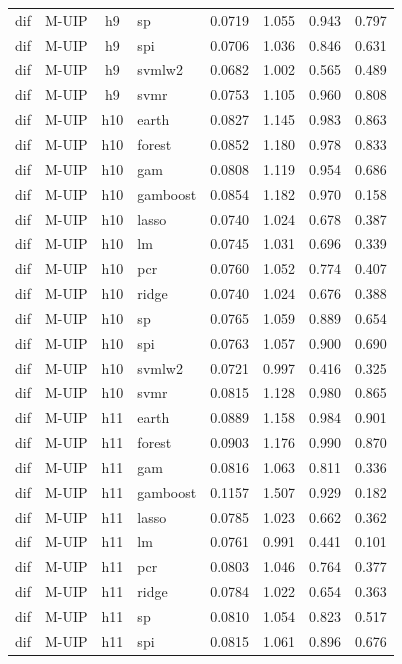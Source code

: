 \begin{ThreePartTable}
\begin{longtable}[t]{llclcccc}
dif & M-UIP & h9 & sp & 0.0719 & 1.055 & 0.943 & 0.797\\
dif & M-UIP & h9 & spi & 0.0706 & 1.036 & 0.846 & 0.631\\
dif & M-UIP & h9 & svmlw2 & 0.0682 & 1.002 & 0.565 & 0.489\\
dif & M-UIP & h9 & svmr & 0.0753 & 1.105 & 0.960 & 0.808\\
\addlinespace
dif & M-UIP & h10 & earth & 0.0827 & 1.145 & 0.983 & 0.863\\
dif & M-UIP & h10 & forest & 0.0852 & 1.180 & 0.978 & 0.833\\
dif & M-UIP & h10 & gam & 0.0808 & 1.119 & 0.954 & 0.686\\
dif & M-UIP & h10 & gamboost & 0.0854 & 1.182 & 0.970 & 0.158\\
dif & M-UIP & h10 & lasso & 0.0740 & 1.024 & 0.678 & 0.387\\
dif & M-UIP & h10 & lm & 0.0745 & 1.031 & 0.696 & 0.339\\
dif & M-UIP & h10 & pcr & 0.0760 & 1.052 & 0.774 & 0.407\\
dif & M-UIP & h10 & ridge & 0.0740 & 1.024 & 0.676 & 0.388\\
dif & M-UIP & h10 & sp & 0.0765 & 1.059 & 0.889 & 0.654\\
dif & M-UIP & h10 & spi & 0.0763 & 1.057 & 0.900 & 0.690\\
dif & M-UIP & h10 & svmlw2 & 0.0721 & 0.997 & 0.416 & 0.325\\
dif & M-UIP & h10 & svmr & 0.0815 & 1.128 & 0.980 & 0.865\\
\addlinespace
dif & M-UIP & h11 & earth & 0.0889 & 1.158 & 0.984 & 0.901\\
dif & M-UIP & h11 & forest & 0.0903 & 1.176 & 0.990 & 0.870\\
dif & M-UIP & h11 & gam & 0.0816 & 1.063 & 0.811 & 0.336\\
dif & M-UIP & h11 & gamboost & 0.1157 & 1.507 & 0.929 & 0.182\\
dif & M-UIP & h11 & lasso & 0.0785 & 1.023 & 0.662 & 0.362\\
dif & M-UIP & h11 & lm & 0.0761 & 0.991 & 0.441 & 0.101\\
dif & M-UIP & h11 & pcr & 0.0803 & 1.046 & 0.764 & 0.377\\
dif & M-UIP & h11 & ridge & 0.0784 & 1.022 & 0.654 & 0.363\\
dif & M-UIP & h11 & sp & 0.0810 & 1.054 & 0.823 & 0.517\\
dif & M-UIP & h11 & spi & 0.0815 & 1.061 & 0.896 & 0.676\\

\end{longtable}
\end{ThreePartTable}
